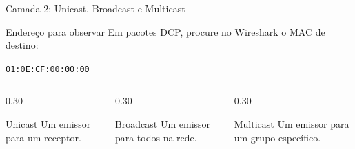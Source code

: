 \documentclass[10pt, aspectratio=169]{beamer}
\begin{document}
\begin{frame}{Camada 2: Unicast, Broadcast e Multicast}
    \small
    \begin{block}{Endere\c{c}o para observar}
        Em pacotes DCP, procure no Wireshark o MAC de destino:
        \begin{center}
            \Large\texttt{01:0E:CF:00:00:00}
        \end{center}
    \end{block}

    \begin{columns}[T,totalwidth=\textwidth]
        \begin{column}{0.30\textwidth}
            \begin{block}{Unicast}
                Um emissor para um receptor.
            \end{block}
        \end{column}
        \begin{column}{0.30\textwidth}
            \begin{block}{Broadcast}
                Um emissor para todos na rede.
            \end{block}
        \end{column}
        \begin{column}{0.30\textwidth}
            \begin{block}{Multicast}
                Um emissor para um grupo espec\'ifico.
            \end{block}
        \end{column}
    \end{columns}
\end{frame}
\end{document}
